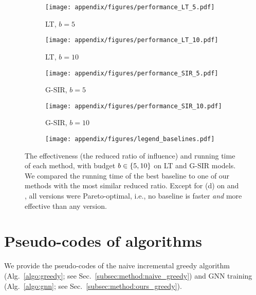 \begin{figure}[t!]
    \centering
    \begin{subfigure}{0.95\linewidth}
        \texttt{[image: appendix/figures/performance\_LT\_5.pdf]}
        \caption{LT, $b=5$}
    \end{subfigure}
    \begin{subfigure}{0.95\linewidth}
            \texttt{[image: appendix/figures/performance\_LT\_10.pdf]}
        \caption{LT, $b=10$}
    \end{subfigure}
    \begin{subfigure}{0.95\linewidth}
        \texttt{[image: appendix/figures/performance\_SIR\_5.pdf]}
        \caption{G-SIR, $b=5$}
    \end{subfigure}
    \begin{subfigure}{0.95\linewidth}
        \texttt{[image: appendix/figures/performance\_SIR\_10.pdf]}
        \caption{G-SIR, $b=10$}
    \end{subfigure}
    \begin{subfigure}{0.95\linewidth}
        \texttt{[image: appendix/figures/legend\_baselines.pdf]}
    \end{subfigure}
    
    \caption{The effectiveness (the reduced ratio of influence) and running time of each method, with budget $b \in \{5, 10\}$ on LT and G-SIR models. We compared the running time of the best baseline to one of our methods with the most similar reduced ratio. Except for (d) on \CL and \EL, all \method versions were Pareto-optimal, i.e., no baseline is faster \textit{and} more effective than any version.
    }
    \label{fig:app_perf_others}
\end{figure}





\section{Pseudo-codes of algorithms}\label{sec:alg}
We provide the pseudo-codes of the naive incremental greedy algorithm (Alg.~\ref{algo:greedy}; see Sec.~\ref{subsec:method:naive_greedy}) and GNN training (Alg.~\ref{algo:gnn}; see Sec.~\ref{subsec:method:ours_greedy}).



